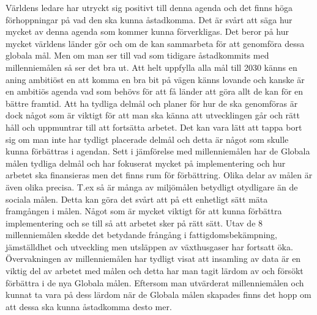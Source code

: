 \documentclass{report}
\begin{document}
Världens ledare har utryckt sig positivt till denna agenda och det finns höga förhoppningar på vad den ska kunna åstadkomma. Det är svårt att säga hur mycket av denna agenda som kommer kunna förverkligas. Det beror på hur mycket världens länder gör och om de kan sammarbeta för att genomföra dessa globala mål. Men om man ser till vad som tidigare åstadkommits med millenniemålen så ser det bra ut. Att helt uppfylla alla mål till 2030 känns en aning ambitiöst en att komma en bra bit på vägen känns lovande och kanske är en ambitiös agenda vad som behövs för att få länder att göra allt de kan för en bättre framtid. Att ha tydliga delmål och planer för hur de ska genomföras är dock något som är viktigt för att man ska känna att utvecklingen går och rätt håll och uppmuntrar till att fortsätta arbetet. Det kan vara lätt att tappa bort sig om man inte har tydligt placerade delmål och detta är något som skulle kunna förbättras i agendan. Sett i jämförelse med millenniemålen har de Globala målen tydliga delmål och har fokuserat mycket på implementering och hur arbetet ska finansieras men det finns rum för förbättring. Olika delar av målen är även olika precisa. T.ex så är många av miljömålen betydligt otydligare än de sociala målen. Detta kan göra det svårt att på ett enhetligt sätt mäta framgången i målen. Något som är mycket viktigt för att kunna förbättra implementering och se till så att arbetet sker på rätt sätt. Utav de 8 millenniemålen skedde det betydande frångång i fattigdomsbekämpning, jämställdhet och utveckling men utsläppen av växthusgaser har fortsatt öka. Övervakningen av millenniemålen har tydligt visat att insamling av data är en viktig del av arbetet med målen och detta har man tagit lärdom av och försökt förbättra i de nya Globala målen.\cite{Millennium} Eftersom man utvärderat millenniemålen och kunnat ta vara på dess lärdom när de Globala målen skapades finns det hopp om att dessa ska kunna åstadkomma desto mer. \\
\end{document}
